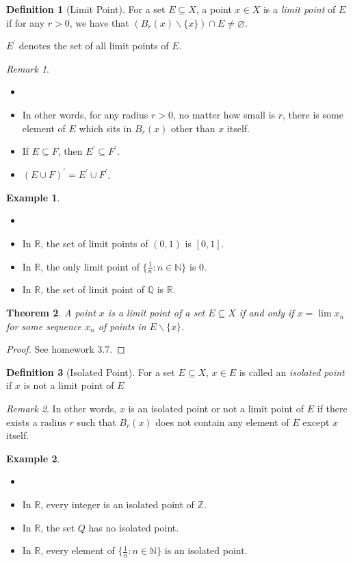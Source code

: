 \documentclass[12pt, lettersize]{book}
\theoremstyle{plain}
\newtheorem{thm}{Theorem}[section]
\theoremstyle{definition}
\newtheorem{dfn}[thm]{Definition}
\newtheorem*{eg}{Example}
\theoremstyle{remark}
\newtheorem*{rem}{Remark}
\newcommand{\R}{\mathbb{R}}
\newcommand{\N}{\mathbb{N}}
\newcommand{\Q}{\mathbb{Q}}
\let\emptyset\varnothing
\begin{document}
	\begin{dfn}[Limit Point]
		For a set $E\subseteq X$, a point $x\in X$ is a \emph{limit point} of $E$ if for any $r>0$, we have that $(B_r(x)\backslash\{x\})\cap E\neq\emptyset$.\smallskip
		
		$E^\prime$ denotes the set of all limit points of $E$.
	\end{dfn}
	\begin{rem}
		\begin{itemize}
			\item[]
			\item In other words, for any radius $r>0$, no matter how small is $r$, there is some element of $E$ which sits in $B_r(x)$ other than $x$ itself. 
			\item If $E\subseteq F$, then $E^\prime\subseteq F^\prime$.
			\item $(E\cup F)^\prime=E^\prime\cup F^\prime$.
		\end{itemize}
	\end{rem}
	\begin{eg}
		\begin{itemize}
			\item[]
			\item In $\R$, the set of limit points of $(0,1)$ is $[0,1]$.
			\item In $\R$, the only limit point of $\{\frac{1}{n}: n\in\N\}$ is $0$.
			\item In $\R$, the set of limit point of $\Q$ is $\R$. 
		\end{itemize}
	\end{eg}
	
	\begin{thm}
		A point $x$ is a limit point of a set $E\subseteq X$ if and only if $x=\lim x_n$ for some sequence $x_n$ of points in $E\backslash\{x\}$. 
	\end{thm}
	\begin{proof}
		See homework 3.7.
	\end{proof}
	
	\begin{dfn}[Isolated Point]
		For a set $E\subseteq X$, $x\in E$ is called an \emph{isolated point} if $x$ is not a limit point of $E$
	\end{dfn}
	\begin{rem}
		In other words, $x$ is an isolated point or not a limit point of $E$ if there exists a radius $r$ such that $B_r(x)$ does not contain any element of $E$ except $x$ itself.
	\end{rem}
	\begin{eg}
		\begin{itemize}
			\item[]
			\item In $\R$, every integer is an isolated point of $\mathbb{Z}$.
			\item In $\R$, the set $Q$ has no isolated point.
			\item In $\R$, every element of $\{\frac{1}{n}: n\in\N\}$ is an isolated point. 
		\end{itemize}
	\end{eg}
	
\end{document}
